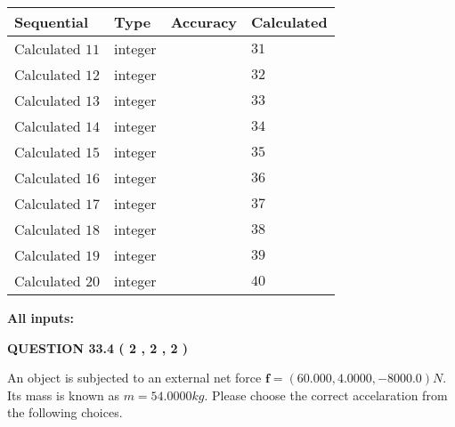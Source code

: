 \documentclass[12pt]{article}
\begin{document}
  
\noindent\begin{tabular}{|l|l|l|l|}
\hline
 Sequential & Type & Accuracy & Calculated \\ 
\hline
 
 
  Calculated $           11 $ & integer &  & 
  $ 31 $ 
 \\  \hline  
 
 
  Calculated $           12 $ & integer &  & 
  $ 32 $ 
 \\  \hline  
 
 
  Calculated $           13 $ & integer &  & 
  $ 33 $ 
 \\  \hline  
 
 
  Calculated $           14 $ & integer &  & 
  $ 34 $ 
 \\  \hline  
 
 
  Calculated $           15 $ & integer &  & 
  $ 35 $ 
 \\  \hline  
 
 
  Calculated $           16 $ & integer &  & 
  $ 36 $ 
 \\  \hline  
 
 
  Calculated $           17 $ & integer &  & 
  $ 37 $ 
 \\  \hline  
 
 
  Calculated $           18 $ & integer &  & 
  $ 38 $ 
 \\  \hline  
 
 
  Calculated $           19 $ & integer &  & 
  $ 39 $ 
 \\  \hline  
 
 
  Calculated $           20 $ & integer &  & 
  $ 40 $ 
 \\  \hline  
 \end{tabular}
   
   
   
   
\noindent\vspace{0.1in}\hspace{-0.08in} {\textbf{\Large{All inputs: }}}
   
   
  
\vspace{0.2in}
  
{\textbf{\Large{QUESTION
33.4 
 (           2 ,           2 ,           2 )
}}}
  
  
 
An object is subjected to an external net force $\mathbf{f}=(
60.000 ,
4.0000,
-8000.0  )N$. Its mass is known as
$m= %
54.0000  kg$. Please choose the correct accelaration
from the following choices.
 
\end{document}
